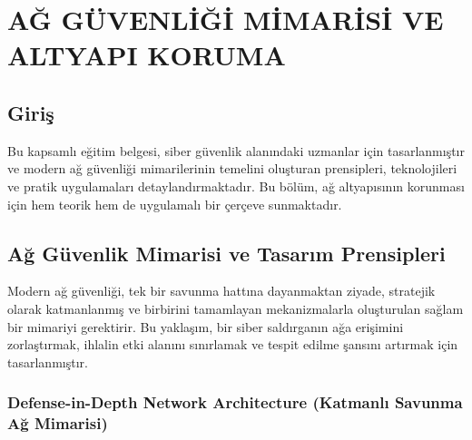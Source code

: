 ﻿\chapter{AĞ GÜVENLİĞİ MİMARİSİ VE ALTYAPI KORUMA}

\section*{Giriş}
Bu kapsamlı eğitim belgesi, siber güvenlik alanındaki uzmanlar için tasarlanmıştır ve modern ağ güvenliği mimarilerinin temelini oluşturan prensipleri, teknolojileri ve pratik uygulamaları detaylandırmaktadır. Bu bölüm, ağ altyapısının korunması için hem teorik hem de uygulamalı bir çerçeve sunmaktadır.

\section{Ağ Güvenlik Mimarisi ve Tasarım Prensipleri}

Modern ağ güvenliği, tek bir savunma hattına dayanmaktan ziyade, stratejik olarak katmanlanmış ve birbirini tamamlayan mekanizmalarla oluşturulan sağlam bir mimariyi gerektirir. Bu yaklaşım, bir siber saldırganın ağa erişimini zorlaştırmak, ihlalin etki alanını sınırlamak ve tespit edilme şansını artırmak için tasarlanmıştır.

\subsection{Defense-in-Depth Network Architecture (Katmanlı Savunma Ağ Mimarisi)}

